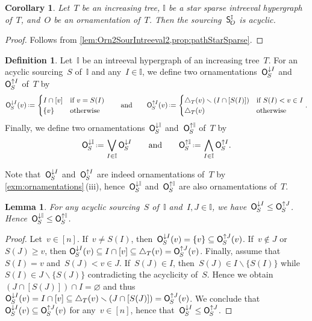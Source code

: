 \documentclass{amsart}
\newtheorem{corollary}[theorem]{Corollary}
\newtheorem{lemma}[theorem]{Lemma}
\theoremstyle{definition}
\newtheorem{definition}[theorem]{Definition}
\newcommand{\ssm}{\smallsetminus} %
\newcommand{\eqdef}{\mbox{\,\raisebox{0.2ex}{\scriptsize\ensuremath{\mathrm:}}\ensuremath{=}\,}} %
\newcommand{\bigMeet}{\bigwedge} %
\newcommand{\bigJoin}{\bigvee} %
\newcommand{\mymap}[2]{\mathsf{#1}_{\hspace{-.7pt}#2}}
\newcommand{\minorn}[2]{\mymap{O}{#1}^{\downarrow#2}}  %
\newcommand{\maxorn}[2]{\mymap{O}{#1}^{\uparrow#2}}  %
\newcommand{\sour}[1]{\mymap{S}{#1}}  %
\newcommand{\II}{\mathbb I} %
\begin{document}
\begin{corollary}
\label{coro:Orn2SourIntreeval3}
Let~$T$ be an increasing tree, $\II$ be a star sparse intreeval hypergraph of~$T$, and~$O$ be an ornamentation of~$T$.
Then the sourcing~$\sour{O}^\II$ is acyclic.
\end{corollary}

\begin{proof}
Follows from \cref{lem:Orn2SourIntreeval2,prop:pathStarSparse}.
\end{proof}


\begin{definition}
Let~$\II$ be an intreeval hypergraph of an increasing tree~$T$.
For an acyclic sourcing~$S$ of~$\II$ and any~$I \in \II$, we define two ornamentations~$\minorn{S}{I}$ and~$\maxorn{S}{I}$ of~$T$ by
\[
\minorn{S}{I}(v) \eqdef \begin{cases} I \cap [v] & \text{if } v = S(I) \\ \{v\} & \text{otherwise} \end{cases}
\qquad\text{and}\qquad
\maxorn{S}{I}(v) \eqdef  \begin{cases} \triangle_T(v) \ssm (I \cap [S(I)]) & \text{if } S(I) < v \in I \\ \triangle_T(v) & \text{otherwise} \end{cases}
.
\]
Finally, we define two ornamentations~$\minorn{S}{\II}$ and~$\maxorn{S}{\II}$ of~$T$ by
\[
\minorn{S}{\II} \eqdef \bigJoin_{I \in \II} \minorn{S}{I}
\qquad\text{and}\qquad
\maxorn{S}{\II} \eqdef \bigMeet_{I \in \II} \maxorn{S}{I}
.
\]
\end{definition}

Note that~$\minorn{S}{I}$ and~$\maxorn{S}{I}$ are indeed ornamentations of~$T$ by \cref{exm:ornamentations}\,(iii), hence~$\minorn{S}{\II}$ and~$\maxorn{S}{\II}$ are also ornamentations of~$T$.

\begin{lemma}
\label{lem:Sour2OrnIntreeval1}
For any acyclic sourcing~$S$ of~$\II$ and~$I, J \in \II$, we have~$\minorn{S}{I} \le \maxorn{S}{J}$.
Hence~$\minorn{S}{\II} \le \maxorn{S}{\II}$.
\end{lemma}

\begin{proof}
Let~$v \in [n]$.
If~$v \ne S(I)$, then~$\minorn{S}{I}(v) = \{v\} \subseteq \maxorn{S}{J}(v)$.
If~$v \notin J$ or~$S(J) \ge v$, then ${\minorn{S}{I}(v) \subseteq I \cap [v] \subseteq \triangle_T(v) = \maxorn{S}{J}(v)}$.
Finally, assume that~$S(I) = v$ and~$S(J) < v \in J$.
If~$S(J) \in I$, then~$S(J) \in I \ssm \{S(I)\}$ while~$S(I) \in J \ssm \{S(J)\}$ contradicting the acyclicity of~$S$.
Hence we obtain~$(J \cap [S(J)]) \cap I = \varnothing$ and thus~$\minorn{S}{I}(v) = I \cap [v] \subseteq \triangle_T(v) \ssm (J \cap [S(J)])= \maxorn{S}{J}(v)$.
We conclude that~$\minorn{S}{I}(v) \subseteq \maxorn{S}{J}(v)$ for any~$v \in [n]$, hence that~$\minorn{S}{I} \le \maxorn{S}{J}$.
\end{proof}
\end{document}
